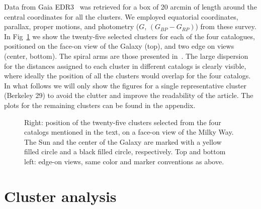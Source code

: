 \documentclass{aa}
\begin{document}
 Data from Gaia EDR3~\citep{Gaia_2016,Gaia_EDR3} was retrieved for a box of 20
 arcmin of length around the central coordinates for all the clusters. We
 employed equatorial coordinates, parallax, proper motions, and photometry
 ($G$, $(G_{BP}-G_{RP})$) from these survey.
 In Fig~\ref{fig:MWmap} we show the twenty-five selected clusters for each of
 the four catalogues, positioned on the face-on view of the Galaxy (top), and
 two edge on views (center, bottom). The spiral arms are those presented
 in~\cite{Momany_2006}. The large dispersion for the distances
 assigned to each cluster in different catalogs is clearly visible, where
 ideally the position of all the clusters would overlap for the four catalogs.\\

 In what follows we will only show the figures for a single representative
 cluster (Berkeley 29) to avoid the clutter and improve the readability of the
 article. The plots for the remaining clusters can be found in the appendix.

 \begin{figure}
  \caption{Right: position of the twenty-five clusters selected from the four
  catalogs mentioned in the text, on a face-on view of the Milky Way. The Sun
  and the center of the Galaxy are marked with a yellow filled circle and a
  black filled circle, respectively. Top and bottom left: edge-on views, same
  color and marker conventions as above.}
  \label{fig:MWmap}
 \end{figure}





\section{Cluster analysis}
 \label{sec:clust_analy}
\end{document}
